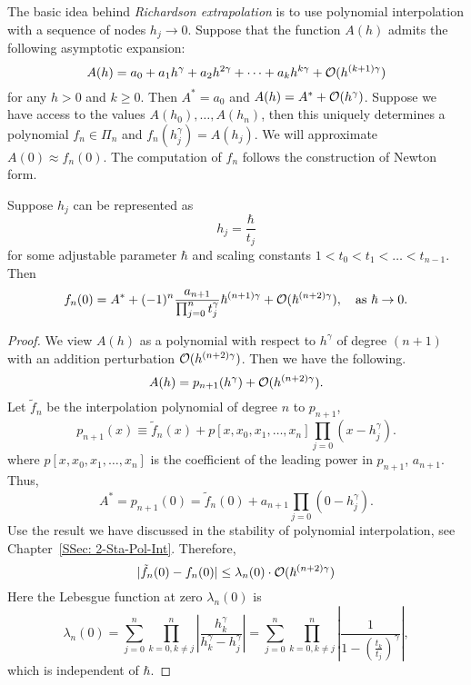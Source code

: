 The basic idea behind \emph{Richardson extrapolation} is to use polynomial interpolation with a sequence of nodes $h_j\to 0$. Suppose that the function $A(h)$ admits the following asymptotic expansion:
\begin{equation}
    A(h) = a_0 + a_1 h^{\gamma} + a_2 h^{2\gamma} + \dots + a_k h^{k\gamma} + \mathcal O(h^{(k+1)\gamma})
\end{equation}
for any $h > 0$ and $k\ge 0$. Then $A^{\ast} = a_0$ and $A(h) = A^{\ast} + \mathcal O(h^{\gamma})$. Suppose we have access to the values $A(h_0),\dots, A(h_n)$, then this uniquely determines a polynomial $f_n\in\Pi_n$ and
$f_n(h_j^{\gamma}) = A(h_j)$. We will approximate $A(0)\approx f_n(0)$. The computation of $f_n$ follows the construction of Newton form. 
\begin{lemma}
\label{Lem: 3-Ric-Ext-Exp}
    Suppose $h_j$ can be represented as 
    $$h_j = \frac{\hbar}{t_j}$$
    for some adjustable parameter $\hbar$ and scaling constants $ 1 < t_0 < t_1<\dots < t_{n-1}$. Then 
    $$f_n(0) = A^{\ast} + (-1)^n \frac{a_{n+1}}{\prod_{j=0}^n t_j^{\gamma}} \hbar^{(n+1)\gamma} + \mathcal O(\hbar^{(n+2)\gamma}),\quad \text{as }\hbar\to 0.$$
\end{lemma} 
\begin{proof}
    We view $A(h)$ as a polynomial with respect to $h^{\gamma}$ of degree $(n+1)$ with an addition perturbation $\mathcal O(h^{(n+2)\gamma})$. Then we have the following. 
    \begin{equation}
        A(h) = p_{n+1}(h^{\gamma}) + \mathcal O(h^{(n+2)\gamma}).
    \end{equation}
    Let $\tilde{f}_n$ be the interpolation polynomial of degree $n$ to $p_{n+1}$, 
    \begin{equation}
        p_{n+1}(x) \equiv \tilde{f}_n(x) + p[x, x_0, x_1, \dots, x_n] \prod_{j=0}(x - h_j^{\gamma}). 
    \end{equation}
    where $p[x, x_0, x_1, \dots, x_n]$ is the coefficient of the leading power in $p_{n+1}$, $a_{n+1}$. Thus, 
    \begin{equation}
        A^{\ast} = p_{n+1}(0) = \tilde{f}_n(0) +a_{n+1} \prod_{j=0}(0 - h_j^{\gamma}). 
    \end{equation} 
    Use the result we have discussed in the stability of polynomial interpolation, see Chapter~\ref{SSec: 2-Sta-Pol-Int}. Therefore, 
    \begin{equation}
        |\tilde{f}_n(0) - f_n(0)|\le \lambda_n(0) \cdot \mathcal O(\hbar^{(n+2)\gamma})
    \end{equation}
    Here the Lebesgue function at zero $\lambda_n(0)$ is 
    \begin{equation}
        \lambda_n(0) = \sum_{j=0}^n \prod_{k=0, k\neq j}^n \left|\frac{h_k^{\gamma}}{h_k^{\gamma} - h_j^{\gamma}}\right| =  \sum_{j=0}^n \prod_{k=0, k\neq j}^n \left|\frac{1}{1 - (\frac{t_k}{t_j})^{\gamma}}\right|,
    \end{equation}
    which is independent of $\hbar$.
\end{proof}
